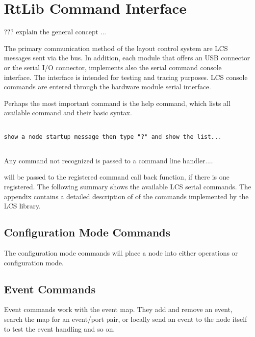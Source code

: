 \chapter{RtLib Command Interface}

???  explain the general concept ...

The primary communication method of the layout control system are LCS messages sent via the bus. In addition, each module that offers an USB connector or the serial I/O connector, implements also the serial command console interface. The interface is intended for testing and tracing purposes. LCS console commands are entered through the hardware module serial interface. 

Perhaps the most important command is the help command, which lists all available command and  their basic syntax.

\lstset{style=codesnippetstyle}
\begin{lstlisting}

show a node startup message then type "?" and show the list...


\end{lstlisting}

Any command not recognized is passed to a command line handler....


will be passed to the registered command call back function, if there is one registered. The following summary shows the available LCS serial commands. The appendix contains a detailed description of of the commands implemented by the LCS library.

\section{Configuration Mode Commands}

The configuration mode commands will place a node into either operations or configuration mode.


\section{Event Commands}

Event commands work with the event map. They add and remove an event, search the map for an event/port pair, or locally send an event to the node itself to test the event handling and so on.

